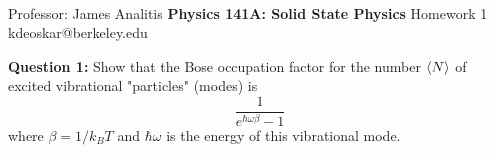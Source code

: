 \documentclass[11pt]{article}
\begin{document}
\thispagestyle{empty}
\bigskip \
\vspace{0.1cm}

\begin{center}
{\fontsize{22}{22} \selectfont Professor: James Analitis}
\vskip 16pt
{\fontsize{30}{30} \selectfont \bf \sffamily Physics 141A: Solid State Physics}
\vskip 24pt
{\fontsize{14}{14} \selectfont \rmfamily Homework 1} 
\vskip 6pt
{\fontsize{14}{14} \selectfont \ttfamily kdeoskar@berkeley.edu} 
\vskip 24pt
\end{center}



\begin{bluebox}
  \textbf{Question 1:} Show that the Bose occupation factor for the number $\langle N \rangle$ of excited vibrational "particles" (modes) is 
  $$ \frac{1}{e^{\hbar \omega \beta} - 1} $$
  where $\beta = 1/k_B T$ and $\hbar \omega$ is the energy of this vibrational mode.
\end{bluebox}
\end{document}

